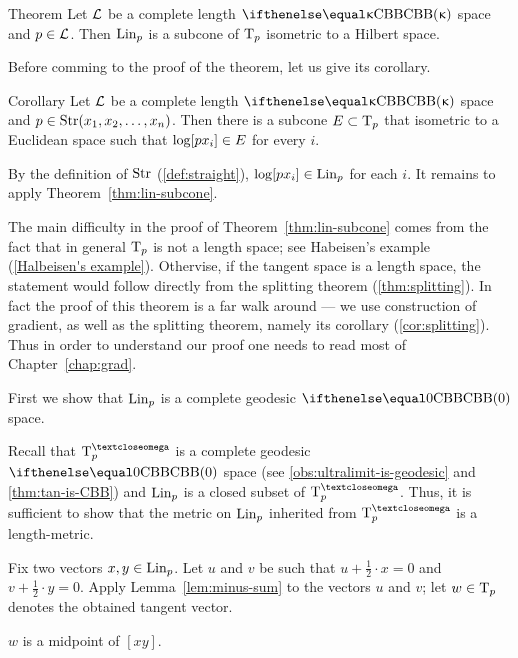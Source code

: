 \begin{thm}{Theorem}\label{thm:lin-subcone}
Let $\mathcal{L}$  be a complete length $\Alex{\kappa}$ space and $p\in \spc{L}$. 
Then $\mathop{\rm Lin}\nolimits_p$ is a subcone of $\text{\rm T}_p$ isometric to a Hilbert space.
\end{thm}

Before comming to the proof of the theorem, 
let us give its corollary.

\begin{thm}{Corollary}\label{cor:euclid-subcone}
Let $\mathcal{L}$  be a complete length $\Alex{\kappa}$ space
and $p\in \Str(x_1,x_2,\dots,x_n)$.
Then there is a subcone $E\subset \T_p$ that isometric to a Euclidean space such that $\ddir p{x_i}\in E$ for every $i$.
\end{thm}

By the definition of $\mathop{\rm Str}\nolimits$ (\ref{def:straight}), $\ddir{p}{x_i}\in \Lin_p$ for each $i$.
It remains to apply Theorem~\ref{thm:lin-subcone}.
\qeds

The main difficulty in the proof of Theorem~\ref{thm:lin-subcone} comes from the fact that in general $\text{\rm T}_p$ is not a length space;
see Habeisen's example (\ref{Halbeisen's example}).
Othervise, if the tangent space is a length space, the statement would follow directly from the splitting theorem (\ref{thm:splitting}).
In fact the proof of this theorem is a far walk around --- we use construction of gradient, as well as the splitting theorem, namely its corollary (\ref{cor:splitting}).
Thus in order to understand our proof one needs to read most of Chapter~\ref{chap:grad}.

First we show that $\mathop{\rm Lin}\nolimits_p$ is a complete geodesic $\Alex0$ space.

Recall that $\T^\o_p$ is a complete geodesic $\Alex0$ space (see \ref{obs:ultralimit-is-geodesic} and \ref{thm:tan-is-CBB}) and $\mathop{\rm Lin}\nolimits_p$ is a closed subset of $\T^\o_p$.
Thus, it is sufficient to show that the metric on $\mathop{\rm Lin}\nolimits_p$ inherited from $\T^\o_p$ is a length-metric.

Fix two vectors $x,y\in\Lin_p$.
Let $u$ and $v$ be such that $u+\tfrac{1}{2}\cdot x=0$ 
and $v+\tfrac{1}{2}\cdot y=0$.
Apply Lemma~\ref{lem:minus-sum} 
to the vectors $u$ and $v$;
let $w\in \T_p$ denotes the obtained tangent vector.
\begin{clm}{}\label{clm:w-mid(xy)}
$w$ is a midpoint of $[x y]$.
\end{clm}

